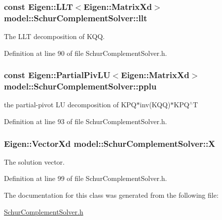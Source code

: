 \hypertarget{classmodel_1_1_schur_complement_solver_a34b95f56894b2e52a9bc2e690ce7da28}{}
\subsubsection[{llt}]{\setlength{\rightskip}{0pt plus 5cm}const Eigen\+::\+L\+L\+T$<$Eigen\+::\+Matrix\+Xd$>$ model\+::\+Schur\+Complement\+Solver\+::llt}\label{classmodel_1_1_schur_complement_solver_a34b95f56894b2e52a9bc2e690ce7da28}


The L\+L\+T decomposition of K\+Q\+Q. 



Definition at line 90 of file Schur\+Complement\+Solver.\+h.

\hypertarget{classmodel_1_1_schur_complement_solver_a49a021c28be0230019e32c2d58b172d3}{}
\subsubsection[{pplu}]{\setlength{\rightskip}{0pt plus 5cm}const Eigen\+::\+Partial\+Piv\+L\+U$<$Eigen\+::\+Matrix\+Xd$>$ model\+::\+Schur\+Complement\+Solver\+::pplu}\label{classmodel_1_1_schur_complement_solver_a49a021c28be0230019e32c2d58b172d3}


the partial-\/pivot L\+U decomposition of K\+P\+Q$\ast$inv(K\+Q\+Q)$\ast$\+K\+P\+Q$^\wedge$\+T 



Definition at line 93 of file Schur\+Complement\+Solver.\+h.

\hypertarget{classmodel_1_1_schur_complement_solver_a9f003385888ebea2f2d52df7bb7dffe7}{}
\subsubsection[{X}]{\setlength{\rightskip}{0pt plus 5cm}Eigen\+::\+Vector\+Xd model\+::\+Schur\+Complement\+Solver\+::\+X}\label{classmodel_1_1_schur_complement_solver_a9f003385888ebea2f2d52df7bb7dffe7}


The solution vector. 



Definition at line 99 of file Schur\+Complement\+Solver.\+h.



The documentation for this class was generated from the following file\+:\begin{DoxyCompactItemize}
\item 
\hyperlink{_schur_complement_solver_8h}{Schur\+Complement\+Solver.\+h}\end{DoxyCompactItemize}
